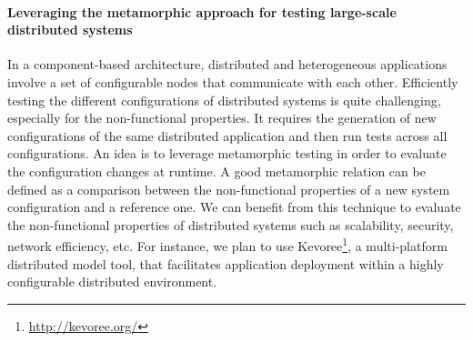 \paragraph{Leveraging the metamorphic approach for testing large-scale distributed systems}
In a component-based architecture, distributed and heterogeneous applications involve a set of configurable nodes that communicate with each other. Efficiently testing the different configurations of distributed systems is quite challenging, especially for the non-functional properties. It requires the generation of new configurations of the same distributed application and then run tests across all configurations. An idea is to leverage metamorphic testing in order to evaluate the configuration changes at runtime. 
A good metamorphic relation can be defined as a comparison between the non-functional properties of a new system configuration and a reference one.
We can benefit from this technique to evaluate the non-functional properties of distributed systems such as scalability, security, network efficiency, etc. For instance, we plan to use Kevoree\footnote{\url{http://kevoree.org/}}, a multi-platform distributed model tool, that facilitates application deployment within a highly configurable distributed environment.
